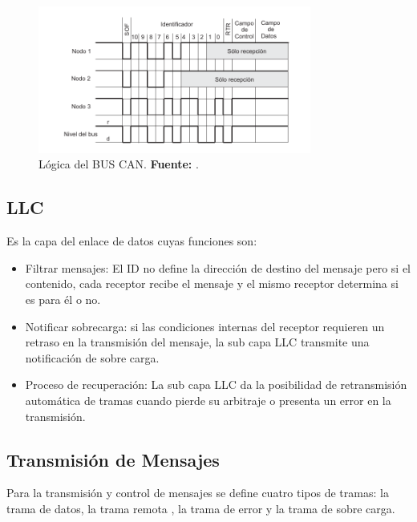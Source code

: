 \begin{figure}[H]
	\centering
		\includegraphics[width=0.8\textwidth]{./Cap2imagen/logicacan.pdf}
	\caption[Lógica del BUS CAN.]{Lógica del BUS CAN.\textbf{ Fuente:} \cite{PSMR}.}
	\label{LID} %
\end{figure}


\subsection {LLC}
Es la capa del enlace de datos cuyas funciones son:

\begin {itemize}
\item Filtrar mensajes: El ID no define la dirección de destino del mensaje pero si el contenido, cada receptor recibe el mensaje y el mismo receptor determina si es para él o no.
\item Notificar sobrecarga: si las condiciones internas del receptor requieren un retraso en la transmisión del mensaje, la sub capa LLC transmite una notificación de sobre carga.
\item Proceso de recuperación: La sub capa LLC da la posibilidad de retransmisión automática de tramas cuando pierde su arbitraje o presenta un error en la transmisión.
\end{itemize}

\subsection {Transmisión de Mensajes}
Para la transmisión y control de mensajes se define cuatro tipos de tramas: la trama de datos, la trama remota , la trama de error y la trama de sobre carga.

